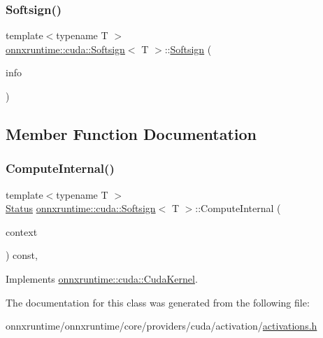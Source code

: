 \subsubsection{\texorpdfstring{Softsign()}{Softsign()}}
{\footnotesize\ttfamily template$<$typename T $>$ \\
\mbox{\hyperlink{classonnxruntime_1_1cuda_1_1Softsign}{onnxruntime\+::cuda\+::\+Softsign}}$<$ T $>$\+::\mbox{\hyperlink{classonnxruntime_1_1cuda_1_1Softsign}{Softsign}} (\begin{DoxyParamCaption}\item[{const \mbox{\hyperlink{classonnxruntime_1_1OpKernelInfo}{Op\+Kernel\+Info}} \&}]{info }\end{DoxyParamCaption})\hspace{0.3cm}{\ttfamily [inline]}}



\subsection{Member Function Documentation}
\mbox{\label{classonnxruntime_1_1cuda_1_1Softsign_ac204135f17eff36f24431c9c9593f7e7}} 
\subsubsection{\texorpdfstring{Compute\+Internal()}{ComputeInternal()}}
{\footnotesize\ttfamily template$<$typename T $>$ \\
\mbox{\hyperlink{classonnxruntime_1_1common_1_1Status}{Status}} \mbox{\hyperlink{classonnxruntime_1_1cuda_1_1Softsign}{onnxruntime\+::cuda\+::\+Softsign}}$<$ T $>$\+::Compute\+Internal (\begin{DoxyParamCaption}\item[{\mbox{\hyperlink{classonnxruntime_1_1OpKernelContext}{Op\+Kernel\+Context}} $\ast$}]{context }\end{DoxyParamCaption}) const\hspace{0.3cm}{\ttfamily [override]}, {\ttfamily [virtual]}}



Implements \mbox{\hyperlink{classonnxruntime_1_1cuda_1_1CudaKernel_aca7af04ae448017d6023d30bba231ebb}{onnxruntime\+::cuda\+::\+Cuda\+Kernel}}.



The documentation for this class was generated from the following file\+:\begin{DoxyCompactItemize}
\item 
onnxruntime/onnxruntime/core/providers/cuda/activation/\mbox{\hyperlink{cuda_2activation_2activations_8h}{activations.\+h}}\end{DoxyCompactItemize}
